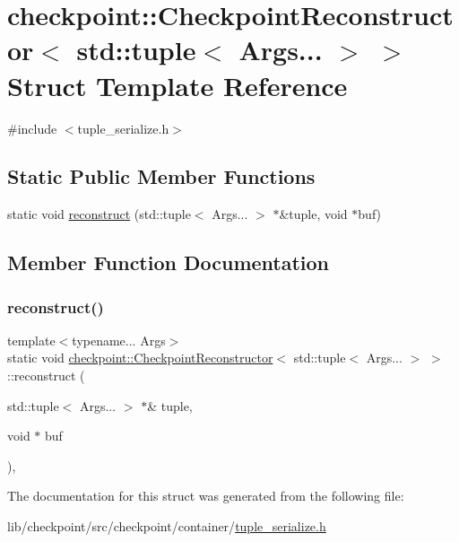 \hypertarget{structcheckpoint_1_1_checkpoint_reconstructor_3_01std_1_1tuple_3_01_args_8_8_8_01_4_01_4}{}\section{checkpoint\+:\+:Checkpoint\+Reconstructor$<$ std\+:\+:tuple$<$ Args... $>$ $>$ Struct Template Reference}
\label{structcheckpoint_1_1_checkpoint_reconstructor_3_01std_1_1tuple_3_01_args_8_8_8_01_4_01_4}


{\ttfamily \#include $<$tuple\+\_\+serialize.\+h$>$}

\subsection*{Static Public Member Functions}
\begin{DoxyCompactItemize}
\item 
static void \hyperlink{structcheckpoint_1_1_checkpoint_reconstructor_3_01std_1_1tuple_3_01_args_8_8_8_01_4_01_4_a352018c0950a259b480efbea4188d37f}{reconstruct} (std\+::tuple$<$ Args... $>$ $\ast$\&tuple, void $\ast$buf)
\end{DoxyCompactItemize}


\subsection{Member Function Documentation}
\mbox{\label{structcheckpoint_1_1_checkpoint_reconstructor_3_01std_1_1tuple_3_01_args_8_8_8_01_4_01_4_a352018c0950a259b480efbea4188d37f}} 
\subsubsection{\texorpdfstring{reconstruct()}{reconstruct()}}
{\footnotesize\ttfamily template$<$typename... Args$>$ \\
static void \hyperlink{structcheckpoint_1_1_checkpoint_reconstructor}{checkpoint\+::\+Checkpoint\+Reconstructor}$<$ std\+::tuple$<$ Args... $>$ $>$\+::reconstruct (\begin{DoxyParamCaption}\item[{std\+::tuple$<$ Args... $>$ $\ast$\&}]{tuple,  }\item[{void $\ast$}]{buf }\end{DoxyParamCaption})\hspace{0.3cm}{\ttfamily [inline]}, {\ttfamily [static]}}



The documentation for this struct was generated from the following file\+:\begin{DoxyCompactItemize}
\item 
lib/checkpoint/src/checkpoint/container/\hyperlink{tuple__serialize_8h}{tuple\+\_\+serialize.\+h}\end{DoxyCompactItemize}
